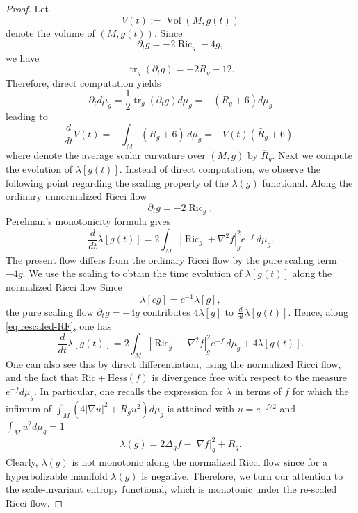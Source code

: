 \documentclass{amsart}
\begin{document}
\begin{proof}
Let
\[
        V(t):=\operatorname{Vol}(M,g(t))
\]
denote the volume of $(M,g(t))$.
Since
\[
        \partial_t g=-2\operatorname{Ric}_g-4g,
\]
we have
\[
        \operatorname{tr}_g(\partial_t g)
        =
        -2R_g-12.
\]
Therefore, direct computation yields
\begin{equation}
\label{eq:measure-evolution-rescaled}
        \partial_t d\mu_g
        =
        \frac{1}{2}\operatorname{tr}_g(\partial_t g)d\mu_g
        =
        -(R_g+6)d\mu_g
\end{equation}
leading to
\begin{equation}
\label{eq:volume-evolution-rescaled}
        \frac{d}{dt}V(t)
        =
        -\int_M (R_g+6)\,d\mu_g
        =
        -V(t)(\bar R_g+6),
\end{equation}
where denote the average scalar curvature over $(M,g)$ by $\overline{R}_{g}$. Next we compute the evolution of \(\lambda[g(t)]\). Instead of direct computation, we observe the following point regarding the scaling property of the $\lambda(g)$ functional. Along the ordinary
unnormalized Ricci flow
\[
        \partial_t g=-2\operatorname{Ric}_g,
\]
Perelman's monotonicity formula gives
\begin{equation}
\label{eq:perelman-lambda-ordinary}
        \frac{d}{dt}\lambda[g(t)]
        =
        2\int_M
        \left|
                \operatorname{Ric}_g+\nabla^2 f
        \right|_g^2
        e^{-f}\,d\mu_g .
\end{equation}
The present flow differs from the ordinary Ricci flow by the pure scaling
term \(-4g\). We use the scaling to obtain the time evolution of $\lambda[g(t)]$ along the normalized Ricci flow Since
\[
        \lambda[cg]=c^{-1}\lambda[g],
\]
the pure scaling flow \(\partial_t g=-4g\) contributes \(4\lambda[g]\) to
\(\frac{d}{dt}\lambda[g(t)]\). Hence, along
\eqref{eq:rescaled-RF}, one has
\begin{equation}
\label{eq:lambda-evolution-rescaled}
        \frac{d}{dt}\lambda[g(t)]
        =
        2\int_M
        \left|
                \operatorname{Ric}_g+\nabla^2 f
        \right|_g^2
        e^{-f}\,d\mu_g
        +
        4\lambda[g(t)].
\end{equation}
One can also see this by direct differentiation, using the normalized Ricci flow, and the fact that $\text{Ric}+\text{Hess}(f)$ is divergence free with respect to the measure $e^{-f}d\mu_{g}$. In particular, one recalls the expression for $\lambda$ in terms of $f$ for which the infimum of $\int_{M}(4|\nabla u|^{2}+R_{g}u^{2})d\mu_{g}$ is attained with $u=e^{-f/2}$ and $\int_{M}u^{2}d\mu_{g}=1$
\begin{align}
    \lambda(g)=2\Delta_{g}f-|\nabla f|^{2}_{g}+R_{g}.
\end{align}
Clearly,  $\lambda(g)$ is not monotonic along the normalized Ricci flow since for a hyperbolizable manifold $\lambda(g)$ is negative. Therefore, we turn our attention to the scale-invariant entropy functional, which is monotonic under the re-scaled Ricci flow.   


\end{proof}
\end{document}
